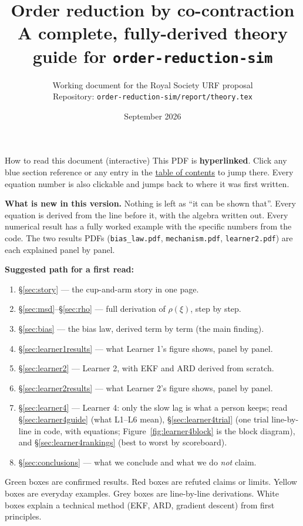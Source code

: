 \documentclass[11pt,a4paper]{article}
\title{\textbf{Order reduction by co-contraction}\\[4pt]
  \large A complete, fully-derived theory guide for \texttt{order-reduction-sim}}
\author{Working document for the Royal Society URF proposal\\
  \small Repository: \texttt{order-reduction-sim/report/theory.tex}}
\date{September 2026}
\begin{document}
\maketitle

\begin{howto}{How to read this document (interactive)}
This PDF is \textbf{hyperlinked}. Click any blue section reference or any entry
in the \hyperref[sec:toc]{table of contents} to jump there. Every equation
number is also clickable and jumps back to where it was first written.

\textbf{What is new in this version.} Nothing is left as ``it can be shown
that''. Every equation is derived from the line before it, with the algebra
written out. Every numerical result has a fully worked example with the
specific numbers from the code. The two results PDFs
(\texttt{bias\_law.pdf}, \texttt{mechanism.pdf}, \texttt{learner2.pdf}) are
each explained panel by panel.

\textbf{Suggested path for a first read:}
\begin{enumerate}[nosep]
\item \S\ref{sec:story} --- the cup-and-arm story in one page.
\item \S\ref{sec:msd}--\S\ref{sec:rho} --- full derivation of $\rho(\xi)$, step by step.
\item \S\ref{sec:bias} --- the bias law, derived term by term (the main finding).
\item \S\ref{sec:learner1results} --- what Learner 1's figure shows, panel by panel.
\item \S\ref{sec:learner2} --- Learner 2, with EKF and ARD derived from scratch.
\item \S\ref{sec:learner2results} --- what Learner 2's figure shows, panel by panel.
\item \S\ref{sec:learner4} --- Learner 4: only the slow lag is what a person keeps;
  read \S\ref{sec:learner4guide} (what L1--L6 mean),
  \S\ref{sec:learner4trial} (one trial line-by-line in code, with equations;
  Figure~\ref{fig:learner4block} is the block diagram), and
  \S\ref{sec:learner4rankings} (best to worst by scoreboard).
\item \S\ref{sec:conclusions} --- what we conclude and what we do \emph{not} claim.
\end{enumerate}

Green boxes are confirmed results. Red boxes are refuted claims or limits.
Yellow boxes are everyday examples. Grey boxes are line-by-line derivations.
White boxes explain a technical method (EKF, ARD, gradient descent) from
first principles.
\end{howto}
\end{document}
